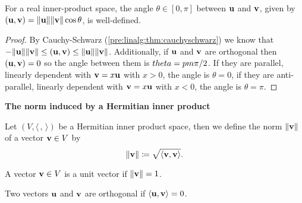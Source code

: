 \documentclass[10pt, a4paper]{article}
\begin{document}
\begin{corollary}
    For a real inner-product space,
    the angle $\theta \in [0, \pi]$ between $\mathbf{u}$ and $\mathbf{v}$,
    given by $(\mathbf{u}, \mathbf{v}) = \|\mathbf{u}\|\|\mathbf{v}\|\cos{\theta}$,
    is well-defined.

    \begin{proof}
        By Cauchy-Schwarz
        (\autoref{pre:linalg:thm:cauchyschwarz})
        we know that $-\|\mathbf{u}\|\|\mathbf{v}\| \leq (\mathbf{u}, \mathbf{v}) \leq \|\mathbf{u}\|\|\mathbf{v}\|$.
        Additionally,
        if $\mathbf{u}$ and $\mathbf{v}$ are orthogonal then $(\mathbf{u}, \mathbf{v}) = 0$ so the angle between them is $\\theta = pm\pi / 2$.
        If they are parallel,
        linearly dependent with $\mathbf{v} = x\mathbf{u}$ with $x > 0$,
        the angle is $\theta = 0$,
        if they are anti-parallel,
        linearly dependent with $\mathbf{v} = x\mathbf{u}$ with $x < 0$,
        the angle is $\theta = \pi$.
    \end{proof}
\end{corollary}

\textbf{The norm induced by a Hermitian inner product}

\begin{definition}
    Let $(V, \langle\,,\,\rangle)$ be a Hermitian inner product space,
    then we define the norm $\|\mathbf{v}\|$ of a vector $\mathbf{v} \in V$ by
    \[
    \|\mathbf{v}\| \coloneqq \sqrt{\langle\mathbf{v}, \mathbf{v}\rangle}.
    \]
\end{definition}

\begin{definition}
    A vector $\mathbf{v} \in V$ is a unit vector if $\|\mathbf{v}\| = 1$.
\end{definition}

\begin{definition}
    Two vectors $\mathbf{u}$ and $\mathbf{v}$ are orthogonal if $\langle\mathbf{u}, \mathbf{v}\rangle = 0$.
\end{definition}
\end{document}

